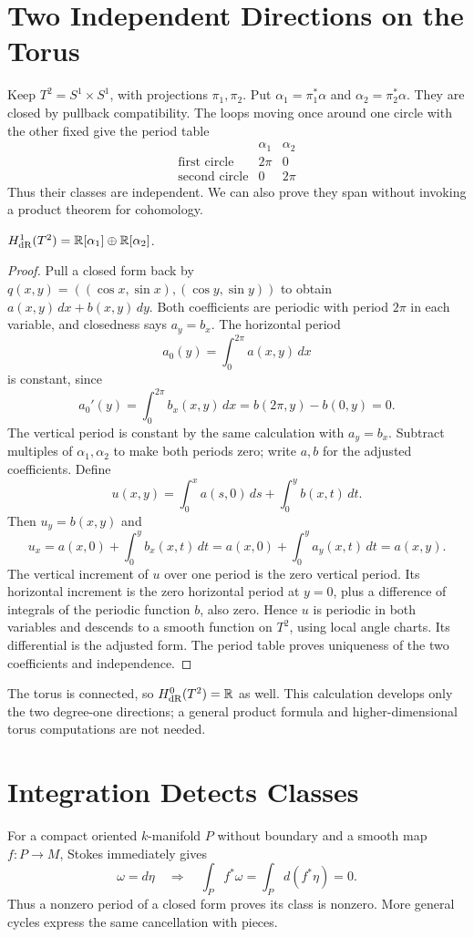 \section{Two Independent Directions on the Torus}
\label{sec:torus-cohomology}
Keep $T^2=S^1\times S^1$, with projections $\pi_1,\pi_2$. Put
$\alpha_1=\pi_1^*\alpha$ and $\alpha_2=\pi_2^*\alpha$.
They are closed by pullback compatibility. The loops moving once around
one circle with the other fixed give the period table
\[
\begin{array}{c|cc}
&\alpha_1&\alpha_2\\\hline
\text{first circle}&2\pi&0\\
\text{second circle}&0&2\pi
\end{array}
\]
Thus their classes are independent. We can also prove they span without
invoking a product theorem for cohomology.
\begin{proposition}\label{prop:torus-h-one}
$H_{\mathrm{dR}}^1(T^2)=\mathbb{R}[\alpha_1]\oplus\mathbb{R}[\alpha_2]$.
\end{proposition}
\begin{proof}
Pull a closed form back by
$q(x,y)=((\cos x,\sin x),(\cos y,\sin y))$ to obtain
$a(x,y)\,dx+b(x,y)\,dy$. Both coefficients are periodic with period
$2\pi$ in each variable, and closedness says $a_y=b_x$.
The horizontal period
\[
a_0(y)=\int_0^{2\pi}a(x,y)\,dx
\]
 is constant, since
\[
a_0'(y)=\int_0^{2\pi}b_x(x,y)\,dx=b(2\pi,y)-b(0,y)=0.
\]
The vertical period is constant by the same calculation with $a_y=b_x$.
Subtract multiples of $\alpha_1,\alpha_2$ to make both periods zero;
write $a,b$ for the adjusted coefficients. Define
\[
u(x,y)=\int_0^x a(s,0)\,ds+\int_0^y b(x,t)\,dt.
\]
Then $u_y=b(x,y)$ and
\[
u_x=a(x,0)+\int_0^y b_x(x,t)\,dt
=a(x,0)+\int_0^y a_y(x,t)\,dt=a(x,y).
\]
The vertical increment of $u$ over one period is the zero vertical
period. Its horizontal increment is the zero horizontal period at $y=0$,
plus a difference of integrals of the periodic function $b$, also zero.
Hence $u$ is periodic in both variables and descends to a smooth function
on $T^2$, using local angle charts. Its differential is the adjusted form.
The period table proves uniqueness of the two coefficients and independence.
\end{proof}
The torus is connected, so $H_{\mathrm{dR}}^0(T^2)=\mathbb{R}$ as well.
This calculation develops only the two degree-one directions; a general
product formula and higher-dimensional torus computations are not needed.

\section{Integration Detects Classes}
\label{sec:integration-cohomology}
For a compact oriented $k$-manifold $P$ without boundary and a smooth map
$f:P\to M$, Stokes immediately gives
\[
\omega=d\eta\quad\Longrightarrow\quad
\int_P f^*\omega=\int_P d(f^*\eta)=0.
\]
Thus a nonzero period of a closed form proves its class is nonzero.
More general cycles express the same cancellation with pieces.

